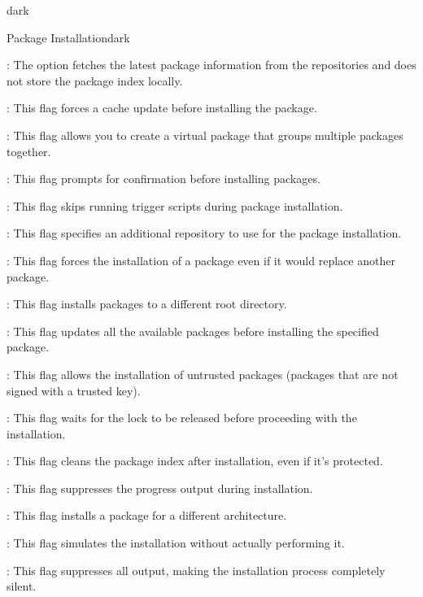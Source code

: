 \begin{baseBoxThree}{}{dark}
    \begin{baseBoxThree}{Package Installation}{dark}
        \smallskip
        \label{apk add}
        \begin{posnexItemize}
            \item[\sA] : The option fetches the latest package information from the repositories and does not store the package index locally.
            \item[\sA] : This flag forces a cache update before installing the package.
            \item[\sA] : This flag allows you to create a virtual package that groups multiple packages together.
            \item[\sA] : This flag prompts for confirmation before installing packages.
            \item[\sA] : This flag skips running trigger scripts during package installation.
            \item[\sA] : This flag specifies an additional repository to use for the package installation.
            \item[\sA] : This flag forces the installation of a package even if it would replace another package.
            \item[\sA] : This flag installs packages to a different root directory.
            \item[\sA] : This flag updates all the available packages before installing the specified package.
            \item[\sA] : This flag allows the installation of untrusted packages (packages that are not signed with a trusted key).
            \item[\sA] : This flag waits for the lock to be released before proceeding with the installation.
            \item[\sA] : This flag cleans the package index after installation, even if it's protected.
            \item[\sA] : This flag suppresses the progress output during installation.
            \item[\sA] : This flag installs a package for a different architecture.
            \item[\sA] : This flag simulates the installation without actually performing it.
            \item[\sA] : This flag suppresses all output, making the installation process completely silent.
        \end{posnexItemize}
        \smallskip
    \end{baseBoxThree}
    \smallskip
\end{baseBoxThree}

